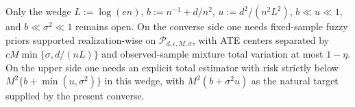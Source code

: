 Only the wedge \(L:=\log(en)\), \(b:=n^{-1}+d/n^2\), \(u:=d^2/(n^2L^2)\), \(b\ll u\ll1\), and \(b\ll\sigma^2\ll1\) remains open.  On the converse side one needs fixed-sample fuzzy priors supported realization-wise on \(\mathcal P_{d,\epsilon,M,\sigma}\), with ATE centers separated by \(cM\min\{\sigma,d/(nL)\}\) and observed-sample mixture total variation at most \(1-\eta\).  On the upper side one needs an explicit total estimator with risk strictly below \(M^2\{b+\min(u,\sigma^2)\}\) in this wedge, with \(M^2(b+\sigma^2u)\) as the natural target supplied by the present converse.